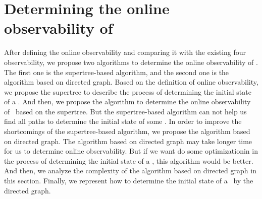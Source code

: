 \section{Determining the online observability of \BCNs}
\label{sec:deter}
After defining the online observability and comparing it with the existing four observability, we propose two algorithms to determine the online observability of \BCNs. The first one is the supertree-based algorithm, and the second one is the algorithm based on directed graph. Based on the definition of online observability, we propose the supertree to describe the process of determining the initial state of a \BCN. And then, we propose the algorithm to determine the online observability of \BCNs\ based on the supertree. But the supertree-based algorithm can not help us find all paths to determine the initial state of some \BCNs. In order to improve the shortcomings of the supertree-based algorithm, we propose the algorithm based on directed graph. The algorithm based on directed graph may take longer time for us to determine online observability. But if we want do some optimizationin in the process of determining the initial state of a \BCN, this algorithm would be better. And then, we analyze the complexity of the algorithm based on directed graph in this section. Finally, we represent how to determine the initial state of a \BCN\ by the directed graph.

